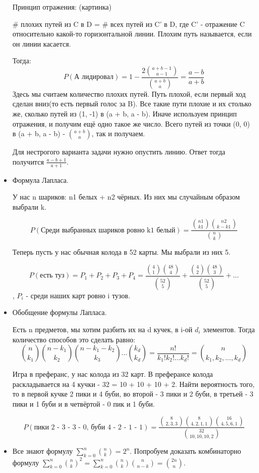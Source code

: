\begin{itemize}
	Принцип отражения: (картинка)
	
	\# плохих путей из C в D = \# всех путей из C' в D, где C' - отражение C относительно какой-то горизонтальной линии. Плохим путь называется, если он линии касается.
	
	Тогда:
	\[P(\text{А лидировал}) = 1 - \frac{2\binom{a + b - 1}{a - 1}}{\binom{a + b}{a}} = \frac{a - b}{a + b}\]
	Здесь мы считаем количество плохих путей. Путь плохой, если первый ход сделан вниз(то есть первый голос за B). Все такие пути плохие и их столько же, сколько путей из (1, -1) в (a + b, a - b). Иначе используем принцип отражения, и получим ещё одно такое же число. Всего путей из точки (0, 0) в (a + b, a - b) - $\binom{a + b}{a}$, так и получаем.
	
	Для нестрогого варианта задачи нужно опустить линию. Ответ тогда получится $\frac{a - b + 1}{a + 1}$.
	
	\item Формула Лапласа.
	
	У нас n шариков: n1 белых + n2 чёрных. Из них мы случайным образом выбрали k.
	
	\[P(\text{Среди выбранных шариков ровно k1 белый}) = \frac{\binom{n1}{k1}\binom{n2}{k - k1}}{\binom{n}{k}}\]
	
	Теперь пусть у нас обычная колода в 52 карты. Мы выбрали из них 5.
	
	\[P(\text{есть туз}) = P_1 + P_2 + P_3 + P_4 = \frac{\binom{4}{1}\binom{48}{4}}{\binom{52}{5}} + \frac{\binom{4}{2}\binom{48}{3}}{\binom{52}{5}} + \dots\], $P_i$ - среди наших карт ровно i тузов.
	
	\item Обобщение формулы Лапласа.
	
	Есть n предметов, мы хотим разбить их на d кучек, в i-ой $d_i$ элементов. Тогда количество способов это сделать равно:
	\[\binom{n}{k_1}\binom{n - k_1}{k_2}\binom{n - k_1 - k_2}{k_3} \dots \binom{k_d}{k_d} = \frac{n!}{k_1!k_2!\dots k_d!} = \binom{n}{k_1, k_2, \dots, k_d}\]
	
	Игра в преферанс, у нас колода из 32 карт. В преферансе колода раскладывается на 4 кучки - 32 = 10 + 10 + 10 + 2. Найти вероятность того, то в первой кучке 2 пики и 4 буби, во второй - 3 пики и 2 буби, в третьей - 3 пики и 1 буби и в четвёртой - 0 пик и 1 буби.
	
	\[P(\text{пики 2 - 3 - 3 - 0, буби 4 - 2 - 1 - 1}) = \frac{\binom{8}{2, 3, 3} \binom{8}{4, 2, 1, 1}\binom{16}{4, 5, 6, 1}}{\binom{32}{10, 10, 10, 2}} \]
	
	\item Все знают формулу $\sum\limits_{k = 0}^{n} \binom{n}{k} = 2^n$. Попробуем доказать комбинаторно формулу $\sum\limits_{k = 0}^n \binom{n}{k}^2 = \sum\limits_{k = 0}^n \binom{n}{k}\binom{n}{n - k} = \binom{2n}{n}$.
	

\end{itemize}
